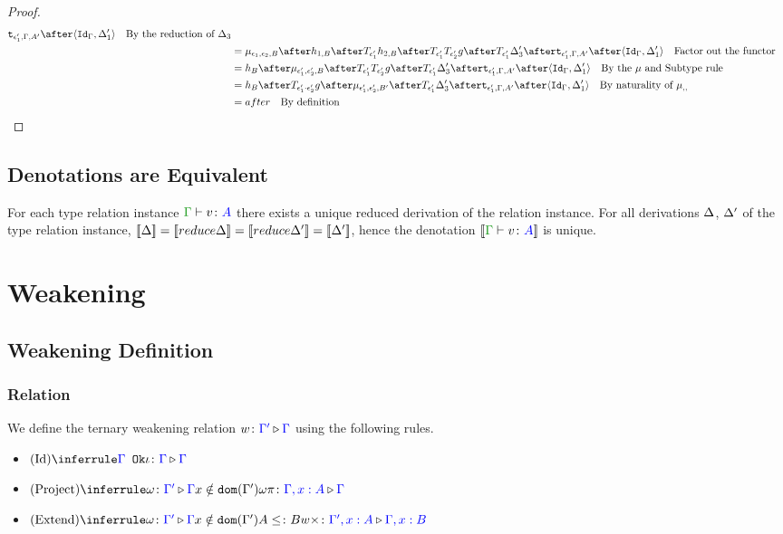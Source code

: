 \documentclass{report}
\begin{document}
\begin{framed}
\begin{proof}
\begin{align*}
                        \tstrength{\e_1'}{\G}{A'}\after\pr{\idg}{\D_1'}\qt{By the reduction of $\D_3$}\\
                        &= \bind{\e_1}{\e_2}{B}\after 
                        h_{1, B}\after\T{\e_1'}{h_{2, B}}\after\T{\e_1'}{\T{\e_2'}{g}}\after \T{\e_1'}{\D_3'}\after
                        \tstrength{\e_1'}{\G}{A'}\after\pr{\idg}{\D_1'}\qt{Factor out the functor}\\
                        &= h_B\after\bind{\e_1'}{\e_2'}{B}\after\T{\e_1'}{\T{\e_2'}{g}}\after \T{\e_1'}{\D_3'}\after
                        \tstrength{\e_1'}{\G}{A'}\after\pr{\idg}{\D_1'}\qt{By the $\mu$ and Subtype rule }\\
                        & = h_B\after\T{\e_1'\dot\e_2'}{g}\after\bind{\e_1'}{\e_2'}{B'}\after \T{\e_1'}{\D_3'}\after
                        \tstrength{\e_1'}{\G}{A'}\after\pr{\idg}{\D_1'}\qt{By naturality of $\bind{}{}{}$ }\\
                        & = after \qt{By definition}
                    \end{align*}
    
\end{proof}
\end{framed}

\section{Denotations are Equivalent}
For each type relation instance $\gtyperelation{v}{A}$ there exists a unique reduced derivation of the relation instance. For all derivations $\Delta$, $\Delta'$ of the type relation instance, $\deno{\D} = \deno{\reduce{\D}} = \deno{\reduce{\D'}} = \deno{\D'} $, hence the denotation $\deno{\gtyperelation{v}{A}}$ is unique.


\chapter{Weakening}
\section{Weakening Definition}
\subsection{Relation}
We define the ternary weakening relation $w \colon {\color{blue}\Gamma'} \triangleright {\color {blue} \Gamma}$ using the following rules.


\begin{itemize}
    \item $\ntreeruleI{Id}{\ok{\G}}{\wrel{\i}{\G}{\G}}$
    \item $\ntreeruleII{Project}{\wrel{\w}{\G'}{\G}}{ x \notin \dom{\G'}}{\wrel{\w \pi}{\G, x: A}{\G}}$
    \item $\ntreeruleIII{Extend}{\wrel{\w}{\G'}{\G}}{ x \notin \dom{\G'}}{ A \subtype B}{\wrel{w \x}{\G', x: A}{\G, x: B}}$
\end{itemize}
\end{document}

